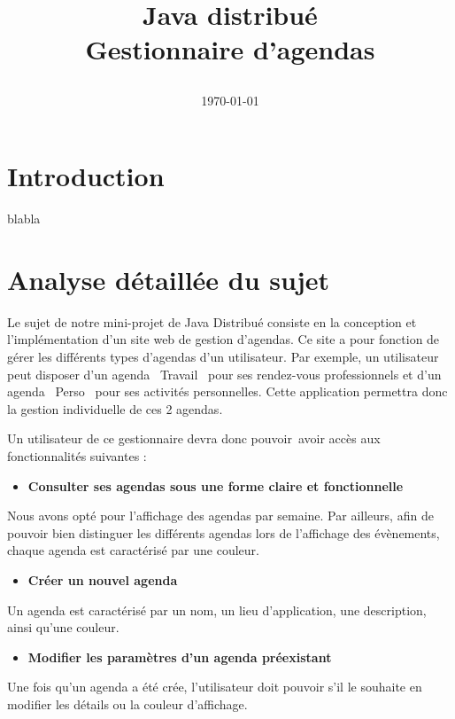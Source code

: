 \documentclass[12pt , a4paper]{article}
\title{Java distribué\\
	\vspace{0.6cm}
	\normalsize{Gestionnaire d'agendas} 
	\begin{center}
	\end{center}
}
\author{\Auteur}
\date{\today}
\begin{document}
	\maketitle
	\thispagestyle{empty}
	\newpage
	\thispagestyle{plain}%

	\tableofcontents
	\newpage
	\section{Introduction}
	\noindent blabla
        
        \section{Analyse détaillée du sujet}

Le sujet de notre mini-projet de Java Distribu\'e consiste en la
conception et l{\textquoteright}impl\'ementation d{\textquoteright}un
site web de gestion d{\textquoteright}agendas. Ce site a pour fonction
de g\'erer les diff\'erents types d{\textquoteright}agendas
d{\textquoteright}un utilisateur. Par exemple, un utilisateur peut
disposer d{\textquoteright}un agenda
{\guillemotleft}~Travail~{\guillemotright} pour ses rendez-vous
professionnels et d{\textquoteright}un agenda
{\guillemotleft}~Perso~{\guillemotright} pour ses activit\'es
personnelles. Cette application permettra donc la gestion individuelle
de ces 2 agendas.




Un utilisateur de ce gestionnaire devra donc pouvoir~avoir acc\`es aux
fonctionnalit\'es suivantes :


\begin{itemize}
\item \textbf{Consulter ses agendas sous une forme claire et
fonctionnelle}
\end{itemize}
Nous avons opt\'e pour l{\textquoteright}affichage des agendas par
semaine. Par ailleurs, afin de pouvoir bien distinguer les diff\'erents
agendas lors de l{\textquoteright}affichage des \'ev\`enements, chaque
agenda est caract\'eris\'e par une couleur.


\begin{itemize}
\item \textbf{Cr\'eer un nouvel agenda}
\end{itemize}
Un agenda est caract\'eris\'e par un nom, un lieu
d{\textquoteright}application, une description, ainsi
qu{\textquoteright}une couleur.


\begin{itemize}
\item \textbf{Modifier les param\`etres d{\textquoteright}un agenda
pr\'eexistant}
\end{itemize}
Une fois qu{\textquoteright}un agenda a \'et\'e cr\'ee,
l{\textquoteright}utilisateur doit pouvoir s{\textquoteright}il le
souhaite en modifier les d\'etails ou la couleur
d{\textquoteright}affichage.
\end{document}
